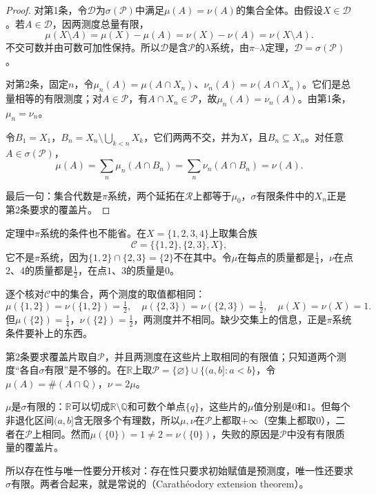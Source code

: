 \begin{proof}
对第1条，令$\mathcal D$为$\sigma(\mathcal P)$中满足$\mu(A)=\nu(A)$的集合全体。由假设$X\in\mathcal D$。若$A\in\mathcal D$，因两测度总量有限，
\[
 \mu(X\setminus A)=\mu(X)-\mu(A)=\nu(X)-\nu(A)=\nu(X\setminus A).
\]
不交可数并由可数可加性保持。所以$\mathcal D$是含$\mathcal P$的$\lambda$系统，由$\pi$--$\lambda$定理，$\mathcal D=\sigma(\mathcal P)$。

对第2条，固定$n$，令$\mu_n(A)=\mu(A\cap X_n)$、$\nu_n(A)=\nu(A\cap X_n)$。它们是总量相等的有限测度；对$A\in\mathcal P$，有$A\cap X_n\in\mathcal P$，故$\mu_n(A)=\nu_n(A)$。由第1条，$\mu_n=\nu_n$。

令$B_1=X_1$，$B_n=X_n\setminus\bigcup_{k<n}X_k$，它们两两不交，并为$X$，且$B_n\subseteq X_n$。对任意$A\in\sigma(\mathcal P)$，
\[
 \mu(A)=\sum_n\mu_n(A\cap B_n)=\sum_n\nu_n(A\cap B_n)=\nu(A).
\]

最后一句：集合代数是$\pi$系统，两个延拓在$\mathcal R$上都等于$\mu_0$，$\sigma$有限条件中的$X_n$正是第2条要求的覆盖片。
\end{proof}

定理中$\pi$系统的条件也不能省。在$X=\{1,2,3,4\}$上取集合族
\[
 \mathcal C=\bigl\{\{1,2\},\{2,3\},X\bigr\},
\]
它不是$\pi$系统，因为$\{1,2\}\cap\{2,3\}=\{2\}$不在其中。令$\mu$在每点的质量都是$\tfrac14$，$\nu$在点$2$、$4$的质量都是$\tfrac12$，在点$1$、$3$的质量是$0$。

逐个核对$\mathcal C$中的集合，两个测度的取值都相同：
\[
 \mu(\{1,2\})=\nu(\{1,2\})=\tfrac12,\quad
 \mu(\{2,3\})=\nu(\{2,3\})=\tfrac12,\quad
 \mu(X)=\nu(X)=1.
\]
但$\mu(\{2\})=\tfrac14$，$\nu(\{2\})=\tfrac12$，两测度并不相同。缺少交集上的信息，正是$\pi$系统条件要补上的东西。

第2条要求覆盖片取自$\mathcal P$，并且两测度在这些片上取相同的有限值；只知道两个测度“各自$\sigma$有限”是不够的。在$\mathbb R$上取$\mathcal P=\{\varnothing\}\cup\{(a,b]:a<b\}$，令$\mu(A)=\#(A\cap\mathbb Q)$，$\nu=2\mu$。

$\mu$是$\sigma$有限的：$\mathbb R$可以切成$\mathbb R\setminus\mathbb Q$和可数个单点$\{q\}$，这些片的$\mu$值分别是$0$和$1$。但每个非退化区间$(a,b]$含无限多个有理数，所以$\mu,\nu$在$\mathcal P$上都取$+\infty$（空集上都取$0$），二者在$\mathcal P$上相同。然而$\mu(\{0\})=1\neq2=\nu(\{0\})$，失败的原因是$\mathcal P$中没有有限质量的覆盖片。

所以存在性与唯一性要分开核对：存在性只要求初始赋值是预测度，唯一性还要求$\sigma$有限。两者合起来，就是常说的（Carathéodory extension theorem）。


